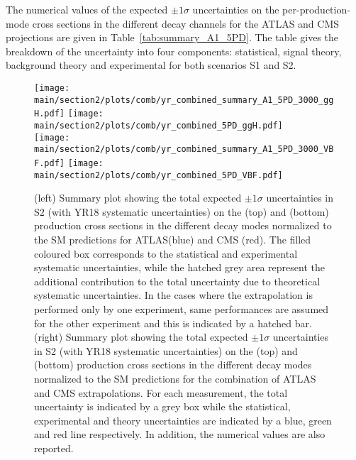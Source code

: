 
The numerical values of the expected $\pm 1\sigma$ uncertainties on the per-production-mode cross sections in the different decay channels for the ATLAS and CMS projections are given in Table~\ref{tab:summary_A1_5PD}. The table  gives the breakdown of the uncertainty into four components: statistical, signal theory, background theory and experimental for both scenarios S1 and S2. 


\begin{figure}[hbtp]
\centering
\texttt{[image: \\main/section2/plots/comb/yr\_combined\_summary\_A1\_5PD\_3000\_ggH.pdf]}%
\texttt{[image: \\main/section2/plots/comb/yr\_combined\_5PD\_ggH.pdf]}\\
\texttt{[image: \\main/section2/plots/comb/yr\_combined\_summary\_A1\_5PD\_3000\_VBF.pdf]}%
\texttt{[image: \\main/section2/plots/comb/yr\_combined\_5PD\_VBF.pdf]}%
\caption{(left) Summary plot showing the total expected $\pm 1\sigma$ uncertainties in S2 (with YR18 systematic uncertainties) on the \ggh (top) and \vbf (bottom) production cross sections in the different decay modes normalized to the SM predictions   for ATLAS(blue)  and CMS (red). The filled coloured box corresponds to the statistical and experimental systematic uncertainties, while the hatched grey area represent the additional contribution to the total uncertainty due to theoretical systematic uncertainties. In the cases where  the extrapolation is performed only by one experiment, same performances are assumed for the other experiment and this is indicated by a  hatched bar.
(right) Summary plot showing the total expected $\pm 1\sigma$  uncertainties in S2 (with YR18 systematic uncertainties) on the \ggh (top) and \vbf (bottom) production cross sections in the different decay modes normalized to the SM predictions for the combination of ATLAS and CMS extrapolations. For each measurement,  the total uncertainty is indicated by a grey box while the statistical, experimental and theory uncertainties are indicated by a blue, green and red line respectively. In addition, the numerical values are also reported.}
\label{fig:summary_A1_5PD_ggH_VBF}
\end{figure}


